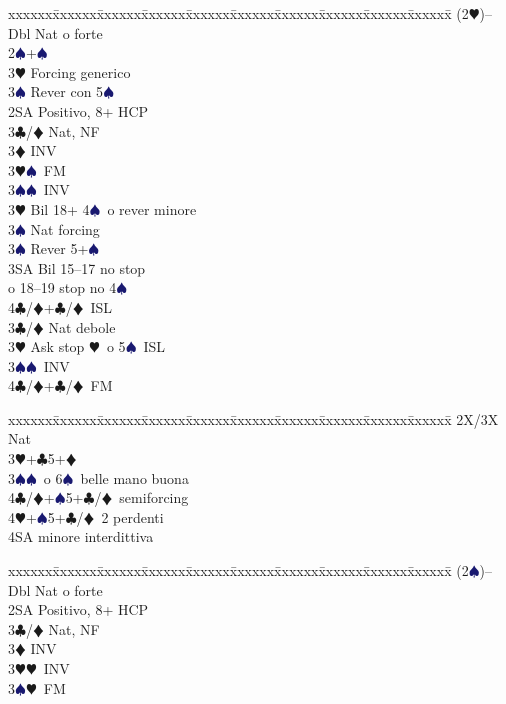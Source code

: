 \documentclass[a4paper,italian]{article}
\newcommand{\BC}{\textcolor{OliveGreen}{$\clubsuit$}}
\newcommand{\BD}{\textcolor{RedOrange}{$\vardiamondsuit$}}
\newcommand{\BH}{\textcolor{Red2}{$\varheartsuit${}}}
\newcommand{\BS}{\textcolor{MidnightBlue}{$\spadesuit${}}}
\newenvironment{bidtable}
{\begin{tabbing}

    xxxxxx\=xxxxxx\=xxxxxx\=xxxxxx\=xxxxxx\=xxxxxx\=xxxxxx\=xxxxxx\=xxxxxx\=xxxxxx\=\kill}
{\end{tabbing} }%
\begin{document}
\begin{multicols}{2}
    \begin{bidtable}
        (2\BH)--\+\\
        Dbl \> Nat o forte\+\\
        2\BS{}+\BS\+\\
        3\BH\> Forcing generico\\
        3\BS\> Rever con 5\BS\-\\
        2SA\> Positivo, 8+ HCP\+\\
        3\BC/\BD \> Nat, NF\+\\
        3\BD\> INV\\
        3\BH{}\BS\ FM\\
        3\BS{}\BS\ INV\-\\
        3\BH\> Bil 18+ 4\BS\ o rever minore\+\\
        3\BS\> Nat forcing\-\\
        3\BS\> Rever 5+\BS\\
        3SA\> Bil 15--17 no stop \+\\\-o 18--19 stop no 4\BS\\
        4\BC/\BD{}+\BC/\BD\ ISL\-\\
        3\BC/\BD\> Nat debole\\
        3\BH\> Ask stop \BH\ o 5\BS\ ISL\\
        3\BS{}\BS\ INV\\
        4\BC/\BD{}+\BC/\BD\ FM
    \end{bidtable}
    \begin{bidtable}
        \>2X/3X\> Nat\+\\
        3\BH{}+\BC5+\BD\\
        3\BS{}\BS\ o 6\BS\ belle mano buona\\
        4\BC/\BD{}+\BS5+\BC/\BD\ semiforcing\\
        4\BH{}+\BS5+\BC/\BD\ 2 perdenti\\
        4SA minore interdittiva
    \end{bidtable}
    \vfill\null
    \columnbreak
    \begin{bidtable}
        (2\BS)--\+\\
        Dbl \> Nat o forte\+\\
        2SA\> Positivo, 8+ HCP\+\\
        3\BC/\BD \> Nat, NF\+\\
        3\BD\> INV\\
        3\BH{}\BH\ INV\\
        3\BS{}\BH\ FM\-\\

\end{bidtable}
\end{multicols}
\end{document}
